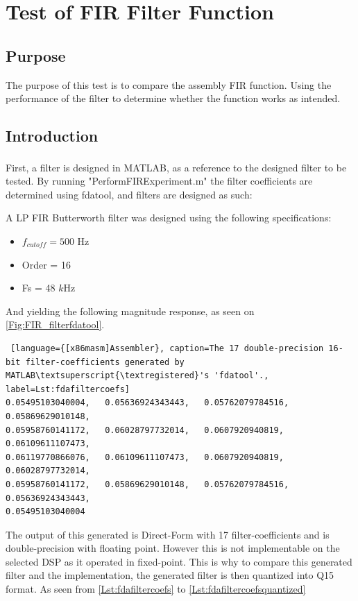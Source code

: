 \section{Test of FIR Filter Function}

\subsection{Purpose}
The purpose of this test is to compare the assembly FIR function. Using the performance of the filter to determine whether the function works as intended.

\subsection{Introduction}
First, a filter is designed in MATLAB\textsuperscript{\textregistered}, as a reference to the designed filter to be tested. By running "PerformFIRExperiment.m" the filter coefficients are determined using fdatool, and filters are designed as such:

A LP FIR Butterworth filter was designed using the following specifications:

\begin{itemize}
	\item $f_{cutoff} = 500$ Hz
	\item Order = 16
	\item Fs = 48 $k$Hz
\end{itemize}


And yielding the following magnitude response, as seen on \autoref{Fig:FIR_filterfdatool}.

\begin{lstlisting} [language={[x86masm]Assembler}, caption=The 17 double-precision 16-bit filter-coefficients generated by MATLAB\textsuperscript{\textregistered}'s 'fdatool'., label=Lst:fdafiltercoefs]
0.05495103040004,	0.05636924343443,	0.05762079784516,	0.05869629010148,
0.05958760141172,	0.06028797732014,	0.0607920940819,	0.06109611107473,
0.06119770866076,	0.06109611107473,	0.0607920940819,	0.06028797732014,
0.05958760141172,	0.05869629010148,	0.05762079784516,	0.05636924343443,
0.05495103040004
\end{lstlisting}


The output of this generated is Direct-Form with 17 filter-coefficients and is double-precision with floating point. However this is not implementable on the selected DSP as it operated in fixed-point. This is why to compare this generated filter and the implementation, the generated filter is then quantized into Q15 format. As seen from \autoref{Lst:fdafiltercoefs} to \autoref{Lst:fdafiltercoefsquantized}

